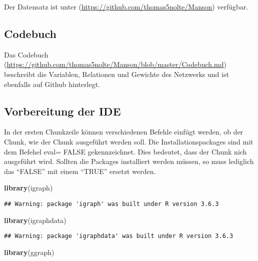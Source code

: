 \documentclass[
]{article}
\newenvironment{Shaded}{\begin{snugshade}}{\end{snugshade}}
\newcommand{\KeywordTok}[1]{\textcolor[rgb]{0.13,0.29,0.53}{\textbf{#1}}}
\newcommand{\NormalTok}[1]{#1}
\begin{document}
Der Datensatz ist unter (\url{https://github.com/thomas5nolte/Manson})
verfügbar.

\hypertarget{codebuch}{%
\subsection{Codebuch}\label{codebuch}}

Das Codebuch
(\url{https://github.com/thomas5nolte/Manson/blob/master/Codebuch.md})
beschreibt die Variablen, Relationen und Gewichte des Netzwerks und ist
ebenfalls auf Github hinterlegt.

\hypertarget{vorbereitung-der-ide}{%
\subsection{Vorbereitung der IDE}\label{vorbereitung-der-ide}}

In der ersten Chunkzeile können verschiedenen Befehle einfügt werden, ob
der Chunk, wie der Chunk ausgeführt werden soll. Die
Installationspackages sind mit dem Befehel eval= FALSE gekennzeichnet.
Dies bedeutet, dass der Chunk nich ausgeführt wird. Sollten die Packages
installiert werden müssen, so muss lediglich das ``FALSE'' mit einem
``TRUE'' ersetzt werden.

\begin{Shaded}
\begin{Highlighting}[]
\KeywordTok{library}\NormalTok{(igraph)}
\end{Highlighting}
\end{Shaded}

\begin{verbatim}
## Warning: package 'igraph' was built under R version 3.6.3
\end{verbatim}

\begin{Shaded}
\begin{Highlighting}[]
\KeywordTok{library}\NormalTok{(igraphdata)}
\end{Highlighting}
\end{Shaded}

\begin{verbatim}
## Warning: package 'igraphdata' was built under R version 3.6.3
\end{verbatim}

\begin{Shaded}
\begin{Highlighting}[]
\KeywordTok{library}\NormalTok{(ggraph)}
\end{Highlighting}
\end{Shaded}
\end{document}
